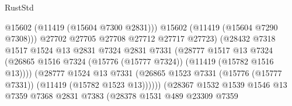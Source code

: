 \begin{lexlean}{RustStd}
\begin{coremodule}
                                              @15602
                                              (@11419 (@15604 @7300 @2831)))
                                            @15602
                                            (@11419 (@15604 @7290 @7308)))
                                          @27702
                                          @27705
                                          @27708
                                          @27712
                                          @27717
                                          @27723)
                                        (@28432
                                          @7318
                                          @1517
                                          @1524
                                          @13
                                          @2831
                                          @7324
                                          @2831
                                          @7331
                                          (@28777
                                            @1517
                                            @13
                                            @7324
                                            (@26865
                                              @1516
                                              @7324
                                              (@15776 (@15777 @7324))
                                              (@11419 (@15782 @1516 @13))))
                                          (@28777
                                            @1524
                                            @13
                                            @7331
                                            (@26865
                                              @1523
                                              @7331
                                              (@15776 (@15777 @7331))
                                              (@11419 (@15782 @1523 @13))))))
                                      (@28367
                                        @1532
                                        @1539
                                        @1546
                                        @13
                                        @7359
                                        @7368
                                        @2831
                                        @7383
                                        (@28378
                                          @1531
                                          @489
                                          @23309
                                          @7359

\end{coremodule}
\end{lexlean}
